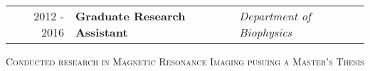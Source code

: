

\begin{minipage}{\textwidth}
	\begin{tabular}{r|ll}
		2012 - 2016 & \textbf{Graduate Research Assistant} & \textit{Department of Biophysics}  \\
	\end{tabular}
\end{minipage}

\begin{center}
	\begin{minipage}{1.0\textwidth}
		\begin{center}
			\textsc{\Large Conducted research in Magnetic Resonance Imaging pusuing a Master's Thesis} \vspace{2mm}
		\end{center}
	\end{minipage}
\end{center}

